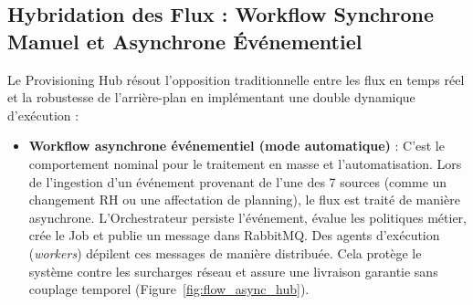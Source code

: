 \subsection{Hybridation des Flux : Workflow Synchrone Manuel et Asynchrone Événementiel}
Le Provisioning Hub résout l'opposition traditionnelle entre les flux en temps réel et la robustesse de l'arrière-plan en implémentant une double dynamique d'exécution :
\begin{itemize}
    \item \textbf{Workflow asynchrone événementiel (mode automatique)} : C'est le comportement nominal pour le traitement en masse et l'automatisation. Lors de l'ingestion d'un événement provenant de l'une des 7 sources (comme un changement RH ou une affectation de planning), le flux est traité de manière asynchrone. L'Orchestrateur persiste l'événement, évalue les politiques métier, crée le Job et publie un message dans RabbitMQ. Des agents d'exécution (\textit{workers}) dépilent ces messages de manière distribuée. Cela protège le système contre les surcharges réseau et assure une livraison garantie sans couplage temporel (Figure~\ref{fig:flow_async_hub}).
    
    \begin{figure}[H]
        \centering
\end{figure}
\end{itemize}
